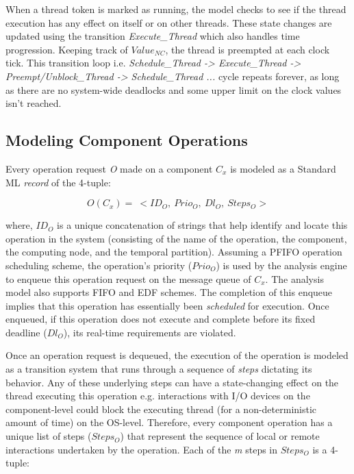 When a thread token is marked as running, the model checks to see if the thread execution has any effect on itself or on other threads. These state changes are updated using the transition \emph{Execute\_Thread} which also handles time progression. Keeping track of $Value_{NC}$, the thread is preempted at each clock tick. This transition loop i.e. \emph{Schedule\_Thread -> Execute\_Thread -> Preempt/Unblock\_Thread -> Schedule\_Thread ...} cycle repeats forever, as long as there are no system-wide deadlocks and some upper limit on the clock values isn't reached.

\subsection{Modeling Component Operations}
\label{sec:Modeling_Component_Operations}
Every operation request \emph{O} made on a component \emph{$C_x$} is modeled as a Standard ML \emph{record} of the 4-tuple:

\begin{equation}
O(C_x) = \ < ID_O, \ Prio_O, \ Dl_O, \  Steps_O >
\end{equation}

where, $ID_O$ is a unique concatenation of strings that help identify and locate this operation in the system (consisting of the name of the operation, the component, the computing node, and the temporal partition). Assuming a PFIFO operation scheduling scheme, the operation's priority ($Prio_O$) is used by the analysis engine to enqueue this operation request on the message queue of $C_x$. The analysis model also supports FIFO and EDF schemes. The completion of this enqueue implies that this operation has essentially been \emph{scheduled} for execution. Once enqueued, if this operation does not execute and complete before its fixed deadline ($Dl_O$), its real-time requirements are violated. 

Once an operation request is dequeued, the execution of the operation is modeled as a transition system that runs through a sequence of \emph{steps} dictating its behavior. Any of these underlying steps can have a state-changing effect on the thread executing this operation e.g. interactions with I/O devices on the component-level could block the executing thread (for a non-deterministic amount of time) on the OS-level. Therefore, every component operation has a unique list of steps ($Steps_O$) that represent the sequence of local or remote interactions undertaken by the operation. Each of the \emph{m} steps in $Steps_O$ is a 4-tuple:

